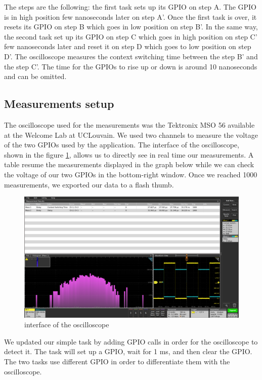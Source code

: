 The steps are the following:
the first task sets up its GPIO on step A.
The GPIO is in high position few nanoseconds later on step A'.
Once the first task is over, it resets its GPIO on step B which goes in low position on step B'.
In the same way, the second task set up its GPIO on step C which goes in high position on step C' few nanoseconds later and reset it on step D which goes to low position on step D'.
The oscilloscope measures the context switching time between the step B' and the step C'.
The time for the GPIOs to rise up or down is around 10 nanoseconds and can be omitted.


\subsection{Measurements setup\label{sec:measurement-setup}}

The oscilloscope used for the measurements was the Tektronix MSO 56\cite{mso56} available at the Welcome Lab at UCLouvain.
We used two channels to measure the voltage of the two GPIOs used by the application.
The interface of the oscilloscope, shown in the figure \ref{fig:oscilloscope-interface}, allows us to directly see in real time our measurements.
A table resume the measurements displayed in the graph below while we can check the voltage of our two GPIOs in the bottom-right window.
Once we reached 1000 measurements, we exported our data to a flash thumb.

\begin{figure}[!ht]
    \centering
    \includegraphics[scale=0.25]{assets/oscilloscope-interface.png}
    \caption{interface of the oscilloscope\label{fig:oscilloscope-interface}}
\end{figure}

We updated our simple task by adding GPIO calls in order for the oscilloscope to detect it.
The task will set up a GPIO, wait for 1 ms, and then clear the GPIO.
The two tasks use different GPIO in order to differentiate them with the oscilloscope.

